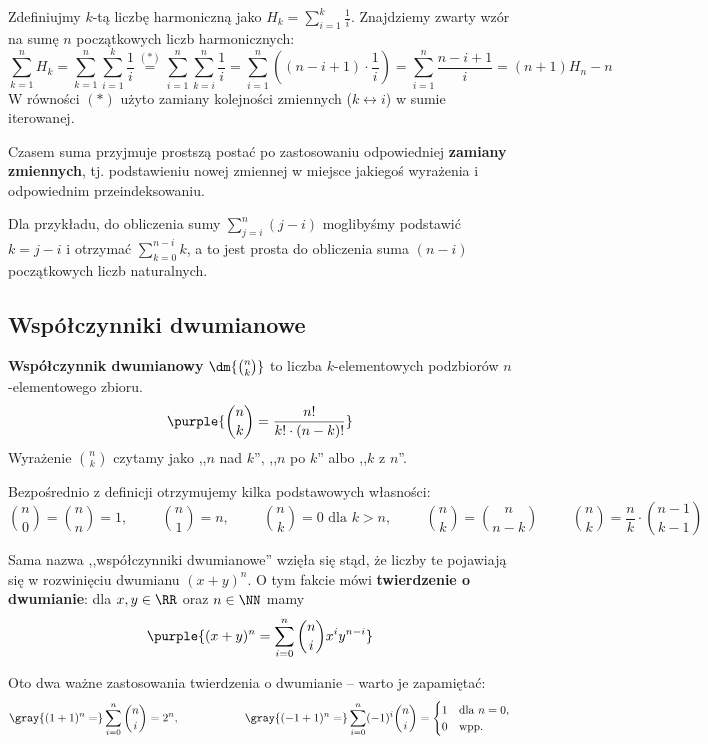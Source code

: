 \begin{example}
    Zdefiniujmy $k$-tą liczbę harmoniczną jako $H_k = \sum_{i = 1}^{k} \frac{1}{i}$. Znajdziemy zwarty wzór na sumę $n$ początkowych liczb harmonicznych:
    $$\sum_{k = 1}^{n} H_k = \sum_{k = 1}^n \sum_{i = 1}^k \frac{1}{i} \overset{(*)}{=} \sum_{i = 1}^n \sum_{k = i}^n \frac{1}{i} = \sum_{i = 1}^n \left((n - i + 1) \cdot \frac{1}{i}\right) = \sum_{i = 1}^n \frac{n - i + 1}{i} = (n + 1)H_n - n$$
    W równości $(*)$ użyto zamiany kolejności zmiennych ($k \leftrightarrow i$) w sumie iterowanej.
\end{example}

Czasem suma przyjmuje prostszą postać po zastosowaniu odpowiedniej \textbf{zamiany zmiennych}, tj. podstawieniu nowej zmiennej w miejsce jakiegoś wyrażenia i odpowiednim przeindeksowaniu.

Dla przykładu, do obliczenia sumy $\sum_{j = i}^{n} (j - i)$ moglibyśmy podstawić $k = j - i$ i otrzymać $\sum_{k = 0}^{n - i} k$, a to jest prosta do obliczenia suma $(n - i)$ początkowych liczb naturalnych.

\subsection{Współczynniki dwumianowe}
\textbf{Współczynnik dwumianowy} $\dm{\binom{n}{k}}$ to liczba $k$-elementowych podzbiorów $n$-elementowego zbioru.
$$\purple{\binom{n}{k} = \frac{n!}{k! \cdot (n - k)!}}$$
Wyrażenie $\binom{n}{k}$ czytamy jako ,,$n$ nad $k$'', ,,$n$ po $k$'' albo ,,$k$ z $n$''.

Bezpośrednio z definicji otrzymujemy kilka podstawowych własności:
$$\binom{n}{0} = \binom{n}{n} = 1, \hspace{1cm} \binom{n}{1} = n, \hspace{1cm} \binom{n}{k} = 0 \text{ dla } k > n, \hspace{1cm} \binom{n}{k} = \binom{n}{n - k} \hspace{1cm} \binom{n}{k} = \frac{n}{k} \cdot \binom{n - 1}{k - 1}$$

Sama nazwa ,,współczynniki dwumianowe'' wzięła się stąd, że liczby te pojawiają się w rozwinięciu dwumianu $(x + y)^n$. O tym fakcie mówi \textbf{twierdzenie o dwumianie}: dla $x, y \in \RR$ oraz $n \in \NN$ mamy
$$\purple{(x + y)^n = \sum_{i = 0}^n \binom{n}{i} x^i y^{n - i}}$$

Oto dwa ważne zastosowania twierdzenia o dwumianie -- warto je zapamiętać:
$$\gray{(1 + 1)^n = } \sum_{i = 0}^n \binom{n}{i} = 2^n, \hspace{2cm} \gray{(-1 + 1)^n = } \sum_{i = 0}^n (-1)^i \binom{n}{i} =
\begin{cases}
    1 &\text{dla } n = 0, \\
    0 &\text{wpp.}
\end{cases}$$

